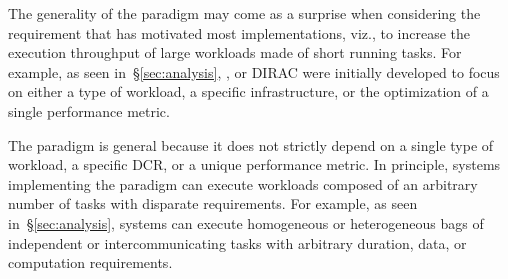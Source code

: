 \documentclass{sig-alternate}
\begin{document}


The generality of the \pilot paradigm may come as a surprise when considering
the requirement that has motivated most implementations, viz., to increase the
execution throughput of large workloads made of short running tasks. For
example, as seen in~\S\ref{sec:analysis}, \panda, or DIRAC were
initially developed to focus on either a type of workload, a specific
infrastructure, or the optimization of a single performance metric.







The \pilot paradigm is general because it does not strictly depend on a single
type of workload, a specific DCR, or a unique performance metric. In principle,
systems implementing the \pilot paradigm can execute workloads composed of an
arbitrary number of tasks with disparate requirements. For example, as seen
in~\S\ref{sec:analysis}, \pilot systems can execute homogeneous or heterogeneous
bags of independent or intercommunicating tasks with arbitrary duration, data,
or computation requirements.
\end{document}
